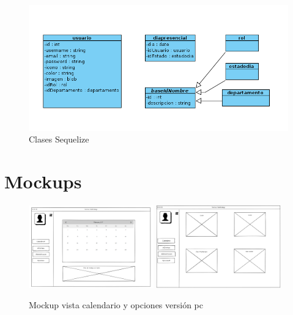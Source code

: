 \documentclass[11pt,spanish,listoffigures,listoftables]{tfgetsinf}
\begin{document}
\begin{figure}[h!] %
  \includegraphics[width=\linewidth]{img/Clases sequelize.png}
  \caption{Clases Sequelize}
  \label{fig:clasesSequelize}
\end{figure}

\section{Mockups}

\begin{figure}[ht!] %
   \includegraphics[width=0.48\textwidth]{img/Vista_Calendario_PC.png}
   \includegraphics[width=0.48\textwidth]{img/Vista_Opciones_PC.png}
   \caption{Mockup vista calendario y opciones versión pc}
   \label{fig:calendarioPC}
 \end{figure}
\end{document}
